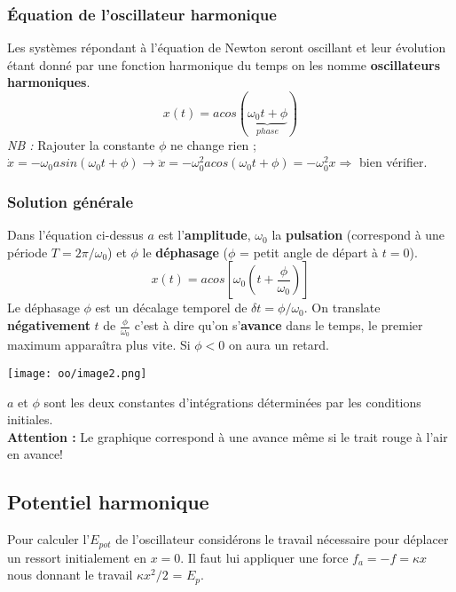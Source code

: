 \documentclass[british,french,11pt, a4paper, openany]{book}
\begin{document}
	\subsubsection*{Équation de l'oscillateur harmonique}
	Les systèmes répondant à l'équation de Newton seront oscillant et leur évolution étant donné par une fonction harmonique du temps on les nomme \textbf{oscillateurs harmoniques}.
	\begin{equation}
		x(t) = a cos(\underbrace{\omega_0 t + \phi}_{phase})
	\end{equation}
	\textit{NB :} Rajouter la constante $\phi$ ne change rien ; $\dot{x} = -\omega_0 a sin(\omega_0t+\phi) \rightarrow \ddot{x} = -\omega_0^2 a cos(\omega_0t+\phi) = -\omega_0^2 x \Rightarrow$ bien vérifier.
	
	\subsubsection*{Solution générale}
	Dans l'équation ci-dessus $a$ est l'\textbf{amplitude}, $\omega_0$ la \textbf{pulsation} (correspond à une période $T = 2\pi/\omega_0$) et $\phi$ le \textbf{déphasage} ($\phi$ = petit angle de départ à $t=0$).
	\begin{equation}
		x(t) = a cos\left[\omega_0\left(t + \frac{\phi}{\omega_0}\right)\right]
	\end{equation}
	Le déphasage $\phi$ est un décalage temporel de $\delta t = \phi/\omega_0$. On translate \textbf{négativement} $t$ de $\frac{\phi}{\omega_0}$ c'est à dire qu'on s'\textbf{avance} dans le temps, le premier maximum apparaîtra plus vite. Si $\phi < 0$ on aura un retard.
	
	\begin{center}
		\texttt{[image: oo/image2.png]}
	\end{center}
	$a$ et $\phi$ sont les deux constantes d'intégrations déterminées par les conditions initiales.\\
	\textbf{Attention :} Le graphique correspond à une avance même si le trait rouge à l'air en avance!
	
	\subsection{Potentiel harmonique}
	Pour calculer l'$E_{pot}$ de l'oscillateur considérons le travail nécessaire pour déplacer un ressort initialement en $x = 0$. Il faut lui appliquer une force $f_a = -f = \kappa x$ nous donnant le travail $\kappa x^2/2$ = $E_p$. 
	
\end{document}
